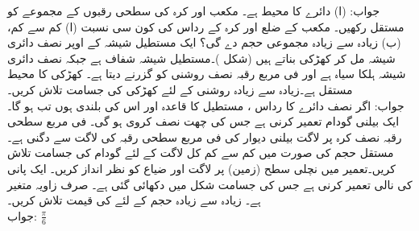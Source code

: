 جواب:\quad
(ا) دائرے کا محیط  ہے۔
مکعب اور کرہ کی سطحی رقبوں کے مجموعے کو مستقل رکھیں۔ مکعب کے ضلع اور کرہ کے رداس کی کون سی نسبت (ا) کم سے کم، (ب) زیادہ سے زیادہ مجموعی حجم دے گی؟
ایک مستطیل شیشہ کے اوپر نصف دائری شیشہ مل کر کھڑکی بناتے ہیں (شکل )۔مستطیل شیشہ شفاف ہے جبکہ نصف دائری شیشہ ہلکا سیاہ ہے اور فی مربع رقبہ نصف روشنی کو گزرنے دیتا ہے۔ کھڑکی کا محیط مستقل ہے۔زیادہ سے زیادہ روشنی کے لئے کھڑکی کی جسامت تلاش کریں۔ \\
جواب:\quad
اگر نصف دائرے کا رداس ، مستطیل کا قاعدہ  اور اس کی بلندی  ہوں تب  ہو گا۔
ایک بیلنی گودام تعمیر کرنی ہے جس کی چھت نصف کروی ہو گی۔ فی مربع سطحی رقبہ نصف کرہ پر لاگت بیلنی دیوار کی فی مربع سطحی رقبہ کی لاگت سے دگنی ہے۔مستقل حجم کی صورت میں کم سے کم کل لاگت کے لئے گودام کی جسامت تلاش کریں۔تعمیر میں نچلی سطح (زمین) پر لاگت اور ضیاع کو نظر انداز کریں۔ 
ایک پانی کی نالی تعمیر کرنی ہے جس کی جسامت شکل  میں دکھائی گئی ہے۔ صرف زاویہ  متغیر ہے۔ زیادہ سے زیادہ حجم کے لئے  کی قیمت تلاش کریں۔\\
جواب:\quad
$\tfrac{\pi}{6}$

